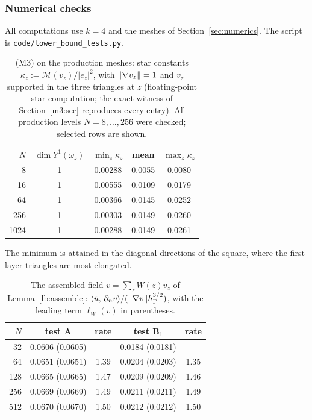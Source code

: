 \subsubsection{Numerical checks}\label{lb:sec:num}
All computations use $k=4$ and the meshes of Section~\ref{sec:numerics}. The script is \texttt{code/}\allowbreak\texttt{lower\_bound\_tests.py}.

\begin{table}[h]
\centering
\caption{(M3) on the production meshes: star constants $\kappa_z:=\mathcal M(v_z)/|e_z|^2$, with $\lVert \nabla v_z\rVert=1$ and $v_z$ supported in the three triangles at $z$ (floating-point star computation; the exact witness of Section~\ref{m3:sec} reproduces every entry). All production levels $N=8,\dots,256$ were checked; selected rows are shown.}\label{lb:tab:stars}
\begin{tabular}{rcccc}
\toprule
$N$ & $\dim Y^1(\omega_z)$ & $\min_z\kappa_z$ & mean & $\max_z\kappa_z$\\
\midrule
8 & 1 & 0.00288 & 0.0055 & 0.0080\\
16 & 1 & 0.00555 & 0.0109 & 0.0179\\
64 & 1 & 0.00366 & 0.0145 & 0.0252\\
256 & 1 & 0.00303 & 0.0149 & 0.0260\\
1024 & 1 & 0.00288 & 0.0149 & 0.0261\\
\bottomrule
\end{tabular}
\end{table}
The minimum is attained in the diagonal directions of the square, where the first-layer triangles are most elongated.

\begin{table}[h]
\centering
\caption{The assembled field $v=\sum_zW(z)v_z$ of Lemma~\ref{lb:assemble}: $\langle \tilde u,\, \partial_n v\rangle/(\lVert \nabla v\rVert h_\Gamma^{3/2})$, with the leading term $\ell_W(v)$ in parentheses.}\label{lb:tab:field}
\begin{tabular}{rcccc}
\toprule
$N$ & test A & rate & test B$_1$ & rate\\
\midrule
32 & 0.0606 (0.0605) & -- & 0.0184 (0.0181) & --\\
64 & 0.0651 (0.0651) & 1.39 & 0.0204 (0.0203) & 1.35\\
128 & 0.0665 (0.0665) & 1.47 & 0.0209 (0.0209) & 1.46\\
256 & 0.0669 (0.0669) & 1.49 & 0.0211 (0.0211) & 1.49\\
512 & 0.0670 (0.0670) & 1.50 & 0.0212 (0.0212) & 1.50\\
\bottomrule
\end{tabular}
\end{table}

